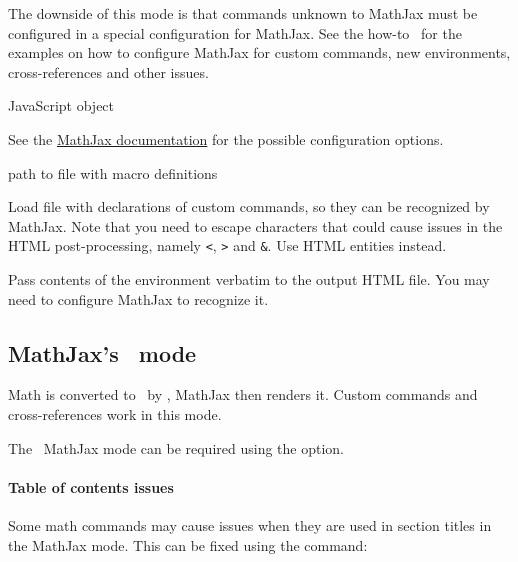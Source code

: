 The downside of this mode is that commands unknown to MathJax must be configured in a special configuration for
MathJax. See the how-to~ for the examples 
on how to configure MathJax for custom commands, new environments, cross-references
and other issues.

 {JavaScript object}\EndDoc

See the \href{https://docs.mathjax.org/en/latest/options/index.html}{MathJax documentation}
for the possible configuration options. 



 {path to file with macro definitions}\EndDoc

Load file with declarations of custom commands, so they can be recognized 
by MathJax. Note that you need to escape characters that could cause issues
in the HTML post-processing, namely \verb|<|, \verb|>| and \verb|&|. Use 
HTML entities instead.


Pass contents of the environment verbatim to the output HTML file.
You may need to configure MathJax to recognize it.



\subsection{MathJax's \mathml\ mode}

Math is converted to \mathml\ by \texfourht, MathJax then renders it. Custom
commands and cross-references work in this mode.

The \mathml\ MathJax mode can be required using the  option.

\paragraph{Table of contents issues}

Some math commands may cause issues when they are used in section titles in the MathJax mode. 
This can be fixed using the \texcommand{\fixmathjaxtoc} command:

\begin{texsource}
\fixmathjaxtoc\int
\end{texsource}

